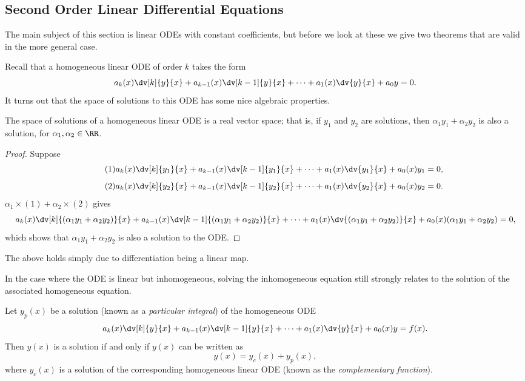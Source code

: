 \subsection{Second Order Linear Differential Equations}
The main subject of this section is linear ODEs with constant coefficients, but before we look at these we give two theorems that are valid in the more general case.

Recall that a homogeneous linear ODE of order $k$ takes the form
\[a_k(x)\dv[k]{y}{x}+a_{k-1}(x)\dv[k-1]{y}{x}+\cdots+a_1(x)\dv{y}{x}+a_0y=0.\]
It turns out that the space of solutions to this ODE has some nice algebraic properties.

\begin{theorem}
The space of solutions of a homogeneous linear ODE is a real vector space; that is, if $y_1$ and $y_2$ are solutions, then $\alpha_1y_1+\alpha_2y_2$ is also a solution, for $\alpha_1,\alpha_2\in\RR$.
\end{theorem}

\begin{proof}
Suppose
\begin{equation*}\tag{1}
a_k(x)\dv[k]{y_1}{x}+a_{k-1}(x)\dv[k-1]{y_1}{x}+\cdots+a_1(x)\dv{y_1}{x}+a_0(x)y_1=0,
\end{equation*}
\begin{equation*}\tag{2}
a_k(x)\dv[k]{y_2}{x}+a_{k-1}(x)\dv[k-1]{y_2}{x}+\cdots+a_1(x)\dv{y_2}{x}+a_0(x)y_2=0.
\end{equation*}
$\alpha_1\times(1)+\alpha_2\times(2)$ gives
\[a_k(x)\dv[k]{(\alpha_1y_1+\alpha_2y_2)}{x}+a_{k-1}(x)\dv[k-1]{(\alpha_1y_1+\alpha_2y_2)}{x}+\cdots+a_1(x)\dv{(\alpha_1y_1+\alpha_2y_2)}{x}+a_0(x)(\alpha_1y_1+\alpha_2y_2)=0,\]
which shows that $\alpha_1y_1+\alpha_2y_2$ is also a solution to the ODE.
\end{proof}

\begin{remark}
The above holds simply due to differentiation being a linear map.
\end{remark}

In the case where the ODE is linear but inhomogeneous, solving the inhomogeneous equation still strongly relates to the solution of the associated homogeneous equation.

\begin{theorem}
Let $y_p(x)$ be a solution (known as a \emph{particular integral}) of the homogeneous ODE
\[a_k(x)\dv[k]{y}{x}+a_{k-1}(x)\dv[k-1]{y}{x}+\cdots+a_1(x)\dv{y}{x}+a_0(x)y=f(x).\]
Then $y(x)$ is a solution if and only if $y(x)$ can be written as
\[y(x)=y_c(x)+y_p(x),\]
where $y_c(x)$ is a solution of the corresponding homogeneous linear ODE (known as the \emph{complementary function}).
\end{theorem}

